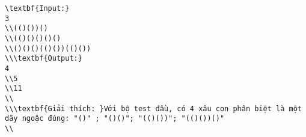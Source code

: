 \begin{verbatim}
\textbf{Input:}
3
\\(()())()
\\(()()()()()
\\()()()(()())(()())
\\\textbf{Output:}
4
\\5
\\11
\\
\\\textbf{Giải thích: }Với bộ test đầu, có 4 xâu con phân biệt là một dãy ngoặc đúng: "()" ; "()()"; "(()())"; "(()())()"
\\\end{verbatim}